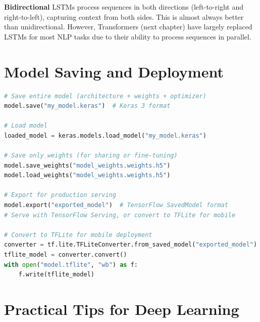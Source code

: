 \documentclass[12pt, a4paper, oneside]{book}
\begin{document}
\begin{notebox}
\textbf{Bidirectional} LSTMs process sequences in both directions (left-to-right and right-to-left), capturing context from both sides. This is almost always better than unidirectional. However, Transformers (next chapter) have largely replaced LSTMs for most NLP tasks due to their ability to process sequences in parallel.
\end{notebox}

\section{Model Saving and Deployment}

\begin{lstlisting}[language=Python, caption={Saving and loading models}]
# Save entire model (architecture + weights + optimizer)
model.save("my_model.keras")  # Keras 3 format

# Load model
loaded_model = keras.models.load_model("my_model.keras")

# Save only weights (for sharing or fine-tuning)
model.save_weights("model_weights.weights.h5")
model.load_weights("model_weights.weights.h5")

# Export for production serving
model.export("exported_model")  # TensorFlow SavedModel format
# Serve with TensorFlow Serving, or convert to TFLite for mobile

# Convert to TFLite for mobile deployment
converter = tf.lite.TFLiteConverter.from_saved_model("exported_model")
tflite_model = converter.convert()
with open("model.tflite", "wb") as f:
    f.write(tflite_model)
\end{lstlisting}

\section{Practical Tips for Deep Learning}
\end{document}

